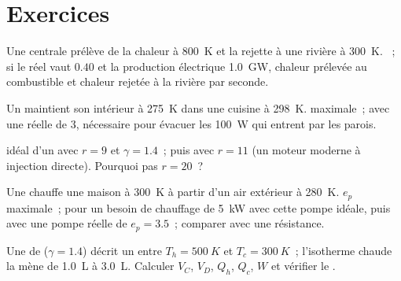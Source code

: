 \section{Exercices}

\begin{exercise}[$\star$]\label{exo:b1:heat-engines:1}
Une centrale prélève de la chaleur à \qty{800}{K} et la rejette à une rivière
à \qty{300}{K}. ~; si le  réel vaut $0.40$ et la
production électrique \qty{1.0}{GW}, chaleur prélevée au combustible et
chaleur rejetée à la rivière par seconde.
\end{exercise}

\begin{exercise}[$\star$]\label{exo:b1:heat-engines:2}
Un  maintient son intérieur à \qty{275}{K} dans une cuisine à
\qty{298}{K}.  maximale~; avec une  réelle de $3$,
 nécessaire pour évacuer les \qty{100}{W} qui entrent par
les parois.
\end{exercise}

\begin{exercise}[$\star$]\label{exo:b1:heat-engines:3}
 idéal d'un  avec $r = 9$ et $\gamma = 1.4$~; puis avec
$r = 11$ (un moteur moderne à injection directe). Pourquoi pas $r = 20$~?
\end{exercise}

\begin{exercise}[$\star$]\label{exo:b1:heat-engines:4}
Une  chauffe une maison à \qty{300}{K} à partir d'un air
extérieur à \qty{280}{K}. $e_p$ maximale~;  pour un besoin
de chauffage de \qty{5}{kW} avec cette pompe idéale, puis avec une pompe
réelle de $e_p = 3.5$~; comparer avec une résistance.
\end{exercise}

\begin{exercise}[$\star\star$]\label{exo:b1:heat-engines:5}
Une  de  ($\gamma = 1.4$) décrit un  entre
$T_h = \qty{500}{K}$ et $T_c = \qty{300}{K}$~; l'isotherme chaude la mène de
\qty{1.0}{L} à \qty{3.0}{L}. Calculer $V_C$, $V_D$, $Q_h$, $Q_c$, $W$ et
vérifier le .
\end{exercise}

